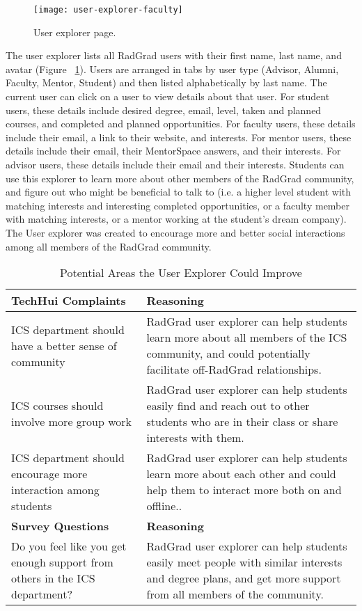 \begin{figure}[htbp!]
\centering
\texttt{[image: user-explorer-faculty]}
\caption{User explorer page.}
\label{user-explorer-faculty}
\end{figure}

The user explorer lists all RadGrad users with their first name, last name, and avatar (Figure ~\ref{user-explorer-faculty}). Users are arranged in tabs by user type (Advisor, Alumni, Faculty, Mentor, Student) and then listed alphabetically by last name. The current user can click on a user to view details about that user. For student users, these details include desired degree, email, level, taken and planned courses, and completed and planned opportunities. For faculty users, these details include their email, a link to their website, and interests. For mentor users, these details include their email, their MentorSpace answers, and their interests. For advisor users, these details include their email and their interests. Students can use this explorer to learn more about other members of the RadGrad community, and figure out who might be beneficial to talk to (i.e. a higher level student with matching interests and interesting completed opportunities, or a faculty member with matching interests, or a mentor working at the student's dream company). The User explorer was created to encourage more and better social interactions among all members of the RadGrad community.

\begin{table}[htbp!]
\centering
 \caption{Potential Areas the User Explorer Could Improve}
\begin{tabular}{  |p{4cm}|p{12cm}| } 
\hline
 \textbf{TechHui Complaints} & \textbf{Reasoning} \\ 
  \hline
  ICS department should have a better sense of community & RadGrad user explorer can help students learn more about all members of the ICS community, and could potentially facilitate off-RadGrad relationships.\\
  \hline
    ICS courses should involve more group work & RadGrad user explorer can help students easily find and reach out to other students who are in their class or share interests with them.\\
  \hline
  ICS department should encourage more interaction among students & RadGrad user explorer can help students learn more about each other and could help them to interact more both on and offline..\\
  \hline
 \textbf{Survey Questions} & \textbf{Reasoning} \\ 
  \hline
    Do you feel like you get enough support from others in the ICS department? & RadGrad user explorer can help students easily meet people with similar interests and degree plans, and get more support from all members of the community. \\
      \hline
\end{tabular}
\end{table}

